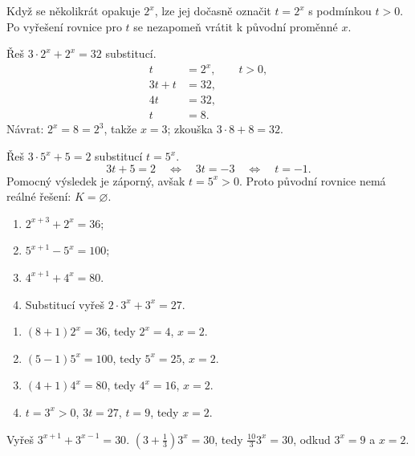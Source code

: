 \documentclass[11pt,a4paper]{article}
\begin{document}
Když se několikrát opakuje $2^x$, lze jej dočasně označit $t=2^x$ s podmínkou $t>0$. Po vyřešení rovnice pro $t$ se nezapomeň vrátit k původní proměnné $x$.
\begin{prikladReseniBox}[title={Příklad 4}]
Řeš $3\cdot2^x+2^x=32$ substitucí.
\tcblower
\[
\begin{aligned}
t&=2^x,\qquad t>0,\\
3t+t&=32,\\
4t&=32,\\
t&=8.
\end{aligned}
\]
Návrat: $2^x=8=2^3$, takže $x=3$; zkouška $3\cdot8+8=32$.
\end{prikladReseniBox}
\begin{prikladReseniBox}[title={Příklad 5}]
Řeš $3\cdot5^x+5=2$ substitucí $t=5^x$.
\tcblower
\[
3t+5=2\quad\Longleftrightarrow\quad 3t=-3\quad\Longleftrightarrow\quad t=-1.
\]
Pomocný výsledek je záporný, avšak $t=5^x>0$. Proto původní rovnice nemá reálné řešení: $K=\varnothing$.
\end{prikladReseniBox}
\begin{zadaniReseniBox}[title={Samostatná práce 1}]
\begin{enumerate}[label=\alph*)]
\item $2^{x+3}+2^x=36$;
\item $5^{x+1}-5^x=100$;
\item $4^{x+1}+4^x=80$.
\item Substitucí vyřeš $2\cdot3^x+3^x=27$.
\end{enumerate}
\tcblower
\begin{enumerate}[label=\alph*)]
\item $(8+1)2^x=36$, tedy $2^x=4$, $x=2$.
\item $(5-1)5^x=100$, tedy $5^x=25$, $x=2$.
\item $(4+1)4^x=80$, tedy $4^x=16$, $x=2$.
\item $t=3^x>0$, $3t=27$, $t=9$, tedy $x=2$.
\end{enumerate}
\end{zadaniReseniBox}
\begin{zadaniReseniBox}[title={Rozšíření 1}]
Vyřeš $3^{x+1}+3^{x-1}=30$.
\tcblower
$(3+\frac{1}{3})3^x=30$, tedy $\frac{10}{3}3^x=30$, odkud $3^x=9$ a $x=2$.
\end{zadaniReseniBox}
\end{document}
